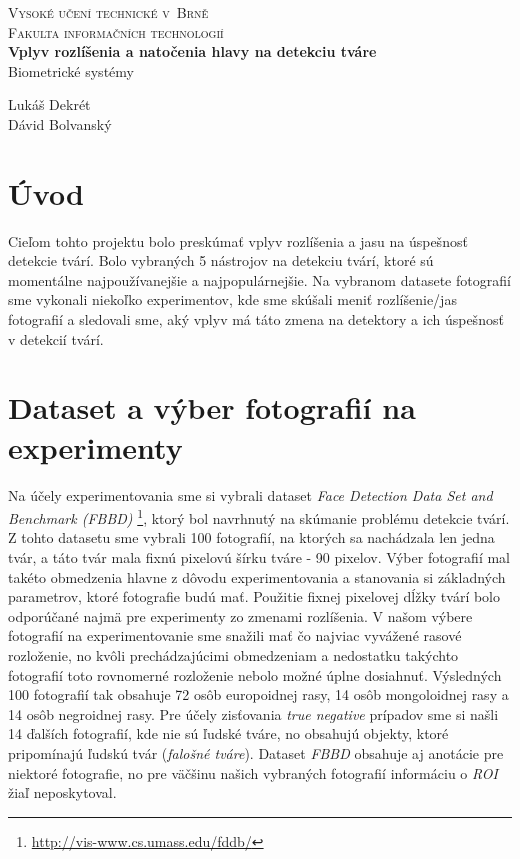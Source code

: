 \documentclass[]{article}
\begin{document}
	
	\begin{titlepage}
		\begin{center}
			\textsc{{\LARGE Vysoké učení technické v~Brně\\[0.3em]
					Fakulta informačních technologií}}\\
			{\Huge \textbf{Vplyv rozlíšenia a natočenia hlavy na detekciu tváre}\\[0.5em]}
			\Large{Biometrické systémy}
		\end{center}
		
		{\noindent \large Lukáš Dekrét\\Dávid Bolvanský}
	\end{titlepage}
	
	\section{Úvod}
	Cieľom tohto projektu bolo preskúmať vplyv rozlíšenia a jasu na úspešnosť detekcie tvárí. Bolo vybraných 5 nástrojov na detekciu tvárí, ktoré sú momentálne najpoužívanejšie a najpopulárnejšie. Na vybranom datasete fotografií sme vykonali niekoľko experimentov, kde sme skúšali meniť rozlíšenie/jas fotografií a sledovali sme, aký vplyv má táto zmena na detektory a ich úspešnosť v detekcií tvárí.
	
	\section{Dataset a výber fotografií na experimenty}
	Na účely experimentovania sme si vybrali dataset \textit{Face Detection Data Set and Benchmark  (FBBD)} \footnote{\url{http://vis-www.cs.umass.edu/fddb/}}, ktorý bol navrhnutý na skúmanie problému detekcie tvárí.
	Z tohto datasetu sme vybrali 100 fotografií, na ktorých sa nachádzala len jedna tvár, a táto tvár mala fixnú pixelovú šírku tváre \-- 90 pixelov. Výber fotografií mal takéto obmedzenia hlavne z dôvodu experimentovania a stanovania si základných parametrov, ktoré fotografie budú mať. Použitie fixnej pixelovej dĺžky tvárí bolo odporúčané najmä pre experimenty zo zmenami rozlíšenia.
	V našom výbere fotografií na experimentovanie sme snažili mať čo najviac vyvážené rasové rozloženie, no kvôli prechádzajúcimi obmedzeniam a nedostatku takýchto fotografií toto rovnomerné rozloženie nebolo možné úplne dosiahnuť. Výsledných 100 fotografií tak obsahuje 72 osôb europoidnej rasy, 14 osôb mongoloidnej rasy a 14 osôb negroidnej rasy. Pre účely zisťovania \textit{true negative} prípadov sme si našli 14 ďalších fotografií, kde nie sú ľudské tváre, no obsahujú objekty, ktoré pripomínajú ľudskú tvár (\textit{falošné tváre}). Dataset \textit{FBBD} obsahuje aj anotácie pre niektoré fotografie, no pre väčšinu našich vybraných fotografií informáciu o \textit{ROI} žiaľ neposkytoval.
	
\end{document}
